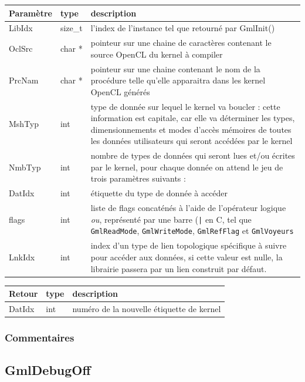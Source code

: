\documentclass[a4paper,12pt]{article}
\begin{document}
\begin{tabular}{|m{2cm}|m{1.5cm}|m{10.5cm}|}
\hline
Paramètre  & type    & description \\
\hline
LibIdx     & size\_t & l'index de l'instance tel que retourné par GmlInit() \\
\hline
OclSrc     & char *  & pointeur sur une chaine de caractères contenant le source OpenCL du kernel à compiler \\
\hline
PrcNam     & char *  & pointeur sur une chaine contenant le nom de la procédure telle qu'elle apparaitra dans les kernel OpenCL générés \\
\hline
MshTyp     & int     & type de donnée sur lequel le kernel va boucler : cette information est capitale, car elle va déterminer les types, dimensionnements et modes d'accès mémoires de toutes les données utilisateurs qui seront accédées par le kernel \\
\hline
NmbTyp     & int     & nombre de types de données qui seront lues et/ou écrites par le kernel, pour chaque donnée on attend le jeu de trois paramètres suivants : \\
\hline
DatIdx     & int     & étiquette du type de donnée à accéder \\
\hline
flags      & int     & liste de flags concaténés à l'aide de l'opérateur logique \emph{ou}, représenté par une barre ({\tt |} en C, tel que {\tt GmlReadMode}, {\tt GmlWriteMode}, {\tt GmlRefFlag} et {\tt GmlVoyeurs} \\
\hline
LnkIdx     & int     & index d'un type de lien topologique spécifique à suivre pour accéder aux données, si cette valeur est nulle, la librairie passera par un lien construit par défaut. \\
\hline
\end{tabular}

\medskip


\begin{tabular}{|m{2cm}|m{1.5cm}|m{10.5cm}|}
\hline
Retour     & type   & description \\
\hline
DatIdx     & int    & numéro de la nouvelle étiquette de kernel\\
\hline
\end{tabular}

\subsubsection*{Commentaires}


\subsection{GmlDebugOff}
\end{document}

